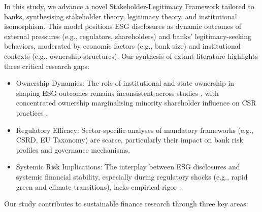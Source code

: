 \documentclass[
  authoryear]{elsarticle}
\begin{document}
In this study, we advance a novel Stakeholder-Legitimacy Framework
\citep{CAMPBELL2007, AGUINIS2012} tailored to banks, synthesising
stakeholder theory, legitimacy theory, and institutional isomorphism.
This model positions ESG disclosures as dynamic outcomes of external
pressures (e.g., regulators, shareholders) and banks' legitimacy-seeking
behaviors, moderated by economic factors (e.g., bank size) and
institutional contexts (e.g., ownership structures). Our synthesis of
extant literature highlights three critical research gaps:

\begin{itemize}
\item
  Ownership Dynamics: The role of institutional and state ownership in
  shaping ESG outcomes remains inconsistent across studies
  \citep{DYCK2019, RAIMO2020}, with concentrated ownership marginalising
  minority shareholder influence on CSR practices \citep{SMITH2022}.
\item
  Regulatory Efficacy: Sector-specific analyses of mandatory frameworks
  (e.g., CSRD, EU Taxonomy) are scarce, particularly their impact on
  bank risk profiles and governance mechanisms.
\item
  Systemic Risk Implications: The interplay between ESG disclosures and
  systemic financial stability, especially during regulatory shocks
  (e.g., rapid green and climate transitions), lacks empirical rigor
  \citep{ESRB2016}.
\end{itemize}

Our study contributes to sustainable finance research through three key
areas:
\end{document}
